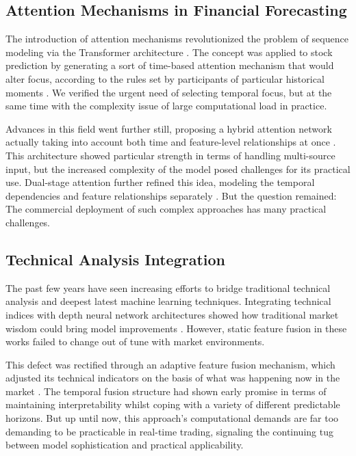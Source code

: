 \documentclass[10pt,twocolumn,letterpaper]{article}
\begin{document}
\subsection{Attention Mechanisms in Financial Forecasting}
The introduction of attention mechanisms revolutionized the problem of sequence modeling via the Transformer architecture \cite{vaswani2017attention}. The concept was applied to stock prediction by generating a sort of time-based attention mechanism that would alter focus, according to the rules set by participants of particular historical moments \cite{huang2019time}. We verified the urgent need of selecting temporal focus, but at the same time with the complexity issue of large computational load in practice.

Advances in this field went further still, proposing a hybrid attention network actually taking into account both time and feature-level relationships at once \cite{chen2018enhancing}. This architecture showed particular strength in terms of handling multi-source input, but the increased complexity of the model posed challenges for its practical use. Dual-stage attention further refined this idea, modeling the temporal dependencies and feature relationships separately \cite{qin2017dual}. But the question remained: The commercial deployment of such complex approaches has many practical challenges.
\subsection{Technical Analysis Integration}
The past few years have seen increasing efforts to bridge traditional technical analysis and deepest latest machine learning techniques. Integrating technical indices with depth neural network architectures showed how traditional market wisdom could bring model improvements \cite{gao2016stock}. However, static feature fusion in these works failed to change out of tune with market environments.

This defect was rectified through an adaptive feature fusion mechanism, which adjusted its technical indicators on the basis of what was happening now in the market \cite{li2020temporal}. The temporal fusion structure had shown early promise in terms of maintaining interpretability whilst coping with a variety of different predictable horizons. But up until now, this approach's computational demands are far too demanding to be practicable in real-time trading, signaling the continuing tug between model sophistication and practical applicability.
\end{document}
